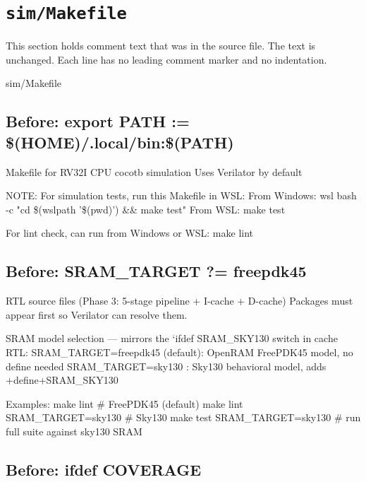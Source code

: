 \section{\texttt{sim/Makefile}}\label{tm:suite:sim-makefile}

This section holds comment text that was in the source file. The text is unchanged. Each line has no leading comment marker and no indentation.

\begin{relocated}{sim/Makefile}

\subsection*{Before: export PATH := \$(HOME)/.local/bin:\$(PATH)}

\begin{textblock}
Makefile for RV32I CPU cocotb simulation
Uses Verilator by default

NOTE: For simulation tests, run this Makefile in WSL:
  From Windows: wsl bash -c "cd \$(wslpath '\$(pwd)') && make test"
  From WSL: make test

For lint check, can run from Windows or WSL:
  make lint
\end{textblock}

\subsection*{Before: SRAM\_TARGET ?= freepdk45}

\begin{textblock}
RTL source files (Phase 3: 5-stage pipeline + I-cache + D-cache)
Packages must appear first so Verilator can resolve them.

SRAM model selection — mirrors the `ifdef SRAM_SKY130 switch in cache RTL:
  SRAM_TARGET=freepdk45 (default): OpenRAM FreePDK45 model, no define needed
  SRAM_TARGET=sky130             : Sky130 behavioral model, adds +define+SRAM_SKY130

Examples:
  make lint                          # FreePDK45 (default)
  make lint SRAM_TARGET=sky130       # Sky130
  make test SRAM_TARGET=sky130       # run full suite against sky130 SRAM
\end{textblock}

\subsection*{Before: ifdef COVERAGE}


\end{relocated}
